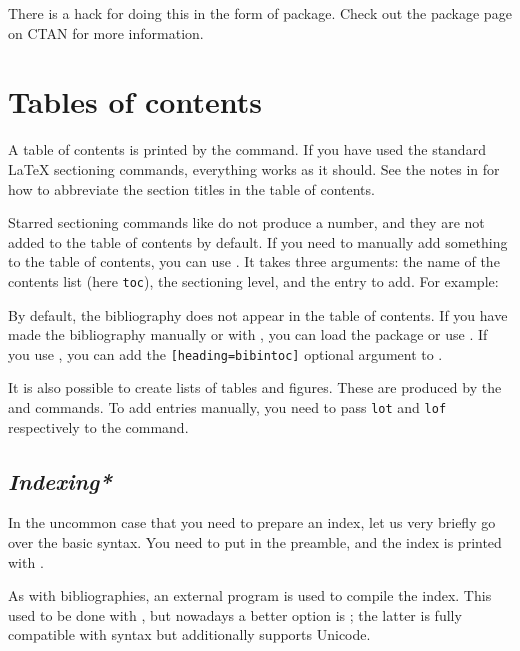 There is a hack for doing this in the form of  package.
Check out the package page on CTAN for more information.




%
%
%
\section{Tables of contents}

A table of contents is printed by the  command.
If you have used the standard \LaTeX{} sectioning commands,
everything works as it should.
See the notes in 
for how to abbreviate the section titles in the table of contents.

Starred sectioning commands like  do not produce a number,
and they are not added to the table of contents by default.
If you need to manually add something to the table of contents,
you can use .
It takes three arguments:
the name of the contents list (here \verb|toc|), the sectioning level, and the entry to add.
For example:
\begin{ExampleCode}
\end{ExampleCode}

By default, the bibliography does not appear in the table of contents.
If you have made the bibliography manually or with ,
you can load the  package or use .
If you use ,
you can add the \verb|[heading=bibintoc]| optional argument to .

It is also possible to create lists of tables and figures.
These are produced by the  and  commands.
To add entries manually, you need to pass \verb|lot| and \verb|lof|
respectively to the  command.


%
\subsection{\emph{Indexing*}}\label{sec:index}

In the uncommon case that you need to prepare an index,
let us very briefly go over the basic syntax.
You need to put  in the preamble,
and the index is printed with .

As with bibliographies, an external program is used to compile the index.
This used to be done with ,
but nowadays a better option is ;
the latter is fully compatible with  syntax
but additionally supports Unicode.

